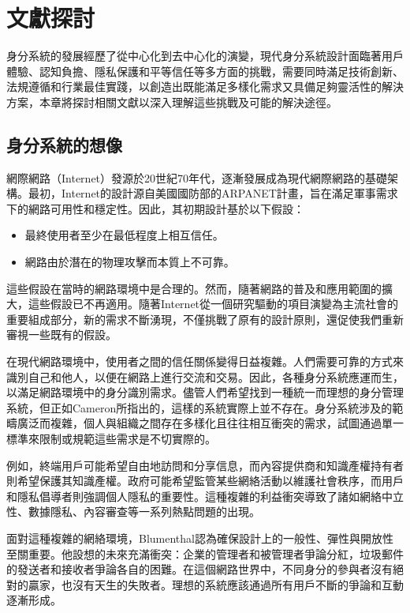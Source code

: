 
\chapter{文獻探討}
身分系統的發展經歷了從中心化到去中心化的演變，現代身分系統設計面臨著用戶體驗、認知負擔、隱私保護和平等信任等多方面的挑戰，需要同時滿足技術創新、法規遵循和行業最佳實踐，以創造出既能滿足多樣化需求又具備足夠靈活性的解決方案，本章將探討相關文獻以深入理解這些挑戰及可能的解決途徑。
\section{身分系統的想像}
網際網路（Internet）發源於20世紀70年代，逐漸發展成為現代網際網路的基礎架構。最初，Internet的設計源自美國國防部的ARPANET計畫，旨在滿足軍事需求下的網路可用性和穩定性。因此，其初期設計基於以下假設\cite{Pekka2010HIP}：
\begin{itemize}
  \item 最終使用者至少在最低程度上相互信任。
  \item 網路由於潛在的物理攻擊而本質上不可靠。
\end{itemize}
這些假設在當時的網路環境中是合理的。然而，隨著網路的普及和應用範圍的擴大，這些假設已不再適用\cite{tomorrowinternet}。隨著Internet從一個研究驅動的項目演變為主流社會的重要組成部分，新的需求不斷湧現，不僅挑戰了原有的設計原則，還促使我們重新審視一些既有的假設。

在現代網路環境中，使用者之間的信任關係變得日益複雜。人們需要可靠的方式來識別自己和他人，以便在網路上進行交流和交易。因此，各種身分系統應運而生，以滿足網路環境中的身分識別需求。儘管人們希望找到一種統一而理想的身分管理系統，但正如Cameron\cite{cameron2005laws}所指出的，這樣的系統實際上並不存在。身分系統涉及的範疇廣泛而複雜，個人與組織之間存在多樣化且往往相互衝突的需求，試圖通過單一標準來限制或規範這些需求是不切實際的。

例如，終端用戶可能希望自由地訪問和分享信息，而內容提供商和知識產權持有者則希望保護其知識產權。政府可能希望監管某些網絡活動以維護社會秩序，而用戶和隱私倡導者則強調個人隱私的重要性。這種複雜的利益衝突導致了諸如網絡中立性、數據隱私、內容審查等一系列熱點問題的出現\cite{Wu2003NetworkNeutrality}。

面對這種複雜的網絡環境，Blumenthal\cite{Blumenthal2001RethinkingThe}認為確保設計上的一般性、彈性與開放性至關重要。他設想的未來充滿衝突：企業的管理者和被管理者爭論分紅，垃圾郵件的發送者和接收者爭論各自的困難。在這個網路世界中，不同身分的參與者沒有絕對的贏家，也沒有天生的失敗者。理想的系統應該通過所有用戶不斷的爭論和互動逐漸形成。

